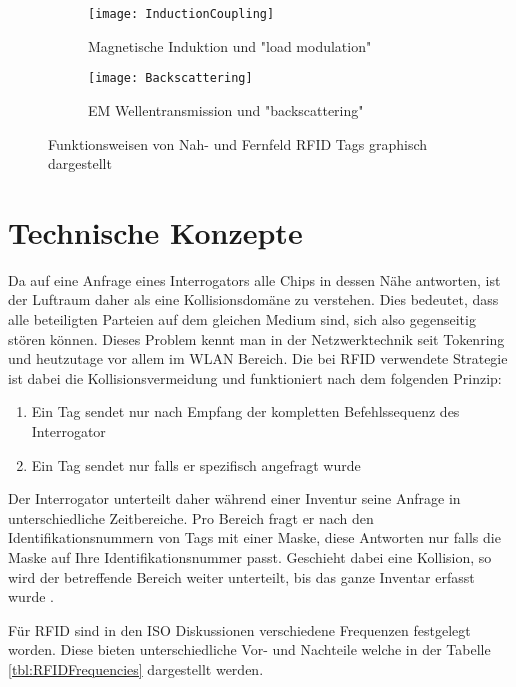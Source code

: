 \begin{figure}[htb]
	\centering
	\begin{subfigure}[b]{0.8\linewidth}
		\centering
		\texttt{[image: InductionCoupling]}
		\caption{Magnetische Induktion und "load modulation"}
	\end{subfigure}
	\begin{subfigure}[b]{0.8\linewidth}
		\centering
		\texttt{[image: Backscattering]}
		\caption{EM Wellentransmission und "backscattering"}
	\end{subfigure}
	\caption{Funktionsweisen von Nah- und Fernfeld \gls{RFID} Tags graphisch dargestellt \parencite{want2006}}
\end{figure}

\section{Technische Konzepte}
\label{sec:technischeKonzepte}

Da auf eine Anfrage eines Interrogators alle Chips in dessen Nähe antworten, ist der Luft\-raum daher als eine Kollisionsdomäne zu verstehen. Dies bedeutet, dass alle beteiligten Parteien auf dem gleichen Medium sind, sich also gegenseitig stören können. Dieses Problem kennt man in der Netzwerktechnik seit Tokenring und heutzutage vor allem im WLAN Bereich. Die bei \gls{RFID} verwendete Strategie ist dabei die Kollisionsvermeidung und funktioniert nach dem folgenden Prinzip:
\begin{enumerate}
	\item Ein Tag sendet nur nach Empfang der kompletten Befehlssequenz des Interrogator
	\item Ein Tag sendet nur falls er spezifisch angefragt wurde
\end{enumerate}
Der Interrogator unterteilt daher während einer Inventur seine Anfrage in unterschiedliche Zeitbereiche. Pro Bereich fragt er nach den Identifikationsnummern von Tags mit einer Maske, diese Antworten nur falls die Maske auf Ihre Identifikationsnummer passt. Geschieht dabei eine Kollision, so wird der betreffende Bereich weiter unterteilt, bis das ganze Inventar erfasst wurde \parencite{ISO15693-3}.

Für \gls{RFID} sind in den ISO Diskussionen verschiedene Frequenzen festgelegt worden. Diese bieten unterschiedliche Vor- und Nachteile welche in der Tabelle \ref{tbl:RFIDFrequencies} dargestellt werden.

